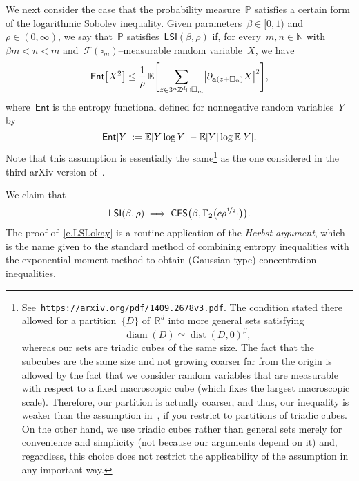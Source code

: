 \documentclass[11pt,twoside]{article} %
\let\oldsquare\square %
\renewcommand{\square}{\oldsquare}
\numberwithin{equation}{section}
\theoremstyle{definition}
\let\originalleft\left
\let\originalright\right
\renewcommand{\left}{\mathopen{}\mathclose\bgroup\originalleft}
\renewcommand{\right}{\aftergroup\egroup\originalright}
\newcommand*{\N}{\ensuremath{\mathbb{N}}}
\newcommand*{\Zd}{\ensuremath{\mathbb{Z}^d}}
\newcommand*{\Rd}{\ensuremath{\mathbb{R}^d}}
\renewcommand{\a}{\mathbf{a}}
\newcommand{\cu}{\square}
\newcommand{\F}{\mathcal{F}}
\renewcommand{\P}{\mathbb{P}}
\newcommand{\E}{\mathbb{E}}
\DeclareMathOperator{\dist}{dist}
\DeclareMathOperator{\diam}{diam}
\newcommand{\Ent}{\mathsf{Ent}}
\newcommand{\CFS}{\mathsf{CFS}}
\newcommand{\LSI}{\mathsf{LSI}}
\begin{document}
We next consider the case that the probability measure~$\P$ satisfies a certain form of the logarithmic Sobolev inequality. Given parameters~$\beta\in [0,1)$ and~$\rho\in (0,\infty)$, we say that~$\P$ satisfies~$\LSI(\beta,\rho)$ if, for every~$m,n\in\N$ with~$\beta m  < n < m$ and~$\F(\cu_m)$--measurable random variable~$X$, we have 
\begin{equation} 
\label{e.LSI.ass}
\Ent\left[  X^2 \right]
\leq 
\frac1\rho\,
\E \Biggl[
\sum_{z\in 3^n\Zd \cap \cu
_m}
\bigl| \partial_{\a(z+\cu_n)} X
\bigr|^2
\Biggr],
\end{equation}
where~$\Ent$ is the entropy functional defined for nonnegative random variables~$Y$ by 
\begin{equation*} \label{}
\Ent\left[  Y \right]:=
\E \left[  Y\log Y \right]
-\E \left[  Y \right] \log \E \left[  Y \right].
\end{equation*}
Note that this assumption is essentially the same\footnote{See~{\tt https://arxiv.org/pdf/1409.2678v3.pdf}. The condition stated there allowed for a partition~$\{ D \}$  of~$\Rd$ into more general sets satisfying
\begin{equation*} \label{}
\diam(D) \simeq \dist(D,0)^{\beta},
\end{equation*}
whereas our sets are triadic cubes of the same size. The fact that the subcubes are the same size and not growing coarser far from the origin is allowed by the fact that we consider random variables that are measurable with respect to a fixed macroscopic cube (which fixes the largest macroscopic scale). Therefore, our partition is actually coarser, and thus, our inequality is weaker than the assumption in~\cite{GNO2}, if you restrict to partitions of triadic cubes. On the other hand, we use triadic cubes rather than general sets merely for convenience and simplicity (not because our arguments depend on it) and, regardless, this choice does not restrict the applicability of the assumption in any important way.} as the one considered in the third arXiv version of~\cite{GNO2}. 

\smallskip

We claim that 
\begin{equation} 
\label{e.LSI.okay}
\LSI(\beta,\rho) \implies \CFS\bigl(\beta, \Gamma_2\bigl(c \rho^{\nicefrac12}  \cdot  \bigr)  \bigr).
\end{equation}
The proof of~\eqref{e.LSI.okay} is a routine application of the \emph{Herbst argument}, which is the name given to the standard method of combining entropy inequalities with the exponential moment method to obtain (Gaussian-type) concentration inequalities. 
\end{document}

